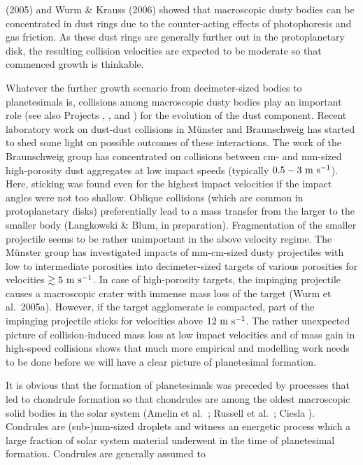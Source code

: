 (2005) and Wurm \& Krauss (2006) showed that macroscopic dusty bodies can be
concentrated in dust rings due to the counter-acting effects of
photophoresis and gas friction. As these dust rings are generally further
out in the protoplanetary disk, the resulting collision velocities are
expected to be moderate so that commenced growth is thinkable.
\par
Whatever the further growth scenario from decimeter-sized bodies
to planetesimals is, collisions among macroscopic dusty bodies
play an important role (see also Projects \projwurm{},
\projblumtrie{}, and \projkley{}) for the evolution of the dust
component. Recent laboratory work on dust-dust collisions in
M\"unster and Braunschweig has started to shed some light on
possible outcomes of these interactions. The work of the
Braunschweig group has concentrated on collisions between cm- and
mm-sized high-porosity dust aggregates at low impact speeds
(typically $0.5-3~\rm m~s^{-1}$). Here, sticking was found even
for the highest impact velocities if the impact angles were not
too shallow. Oblique collisions (which are common in
protoplanetary disks) preferentially lead to a mass transfer from
the larger to the smaller body (Langkowski \& Blum, in
preparation). Fragmentation of the smaller projectile seems to be
rather unimportant in the above velocity regime. The M\"unster
group has investigated impacts of mm-cm-sized dusty projectiles
with low to intermediate porosities into decimeter-sized targets
of various porosities for velocities $\gtrsim 5~\rm m~s^{-1}$. In
case of high-porosity targets, the impinging projectile causes a
macroscopic crater with immense mass loss of the target (Wurm et
al.~2005a). However, if the target agglomerate is compacted, part
of the impinging projectile sticks for velocities above $12~\rm
m~s^{-1}$. The rather unexpected picture of collision-induced mass
loss at low impact velocities and of mass gain in high-speed
collisions shows that much more empirical and modelling work needs
to be done before we will have a clear picture of planetesimal
formation.
\par
It is obvious that the formation of planetesimals was preceded by
processes that led to chondrule formation so that chondrules are
among the oldest macroscopic solid bodies in the solar system 
(Amelin et al.~; Russell et al.~; Ciesla
). Condrules are (sub-)mm-sized droplets and witness an
energetic process which a large fraction of solar system material underwent
in the time of planetesimal formation. Condrules are generally assumed to
